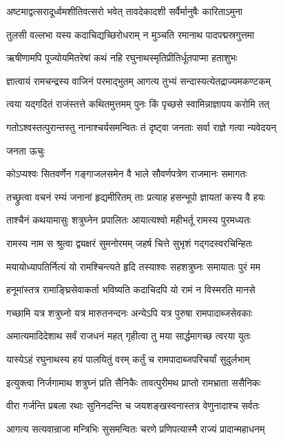 \twolineshloka
{अष्टमाद्वत्सरादूर्ध्वमशीतिवत्सरो भवेत्}
{तावदेकादशी सर्वैर्मानुषैः कारिताऽमुना}%

\twolineshloka
{तुलसी वल्लभा यस्य कदाचिद्यच्छिरोधराम्}
{न मुञ्चति रमानाथ पादपद्मस्रगुत्तमा}%

\twolineshloka
{ऋषीणामपि पूज्योयमितरेषां कथं नहि}
{रघुनाथस्मृतिप्रीतिर्धूतपाप्मा हताशुभः}%

\twolineshloka
{ज्ञात्वायं रामचन्द्रस्य वाजिनं परमाद्भुतम्}
{आगत्य तुभ्यं सन्दास्यत्येतद्राज्यमकण्टकम्}%

\twolineshloka
{त्वया यद्गदितं राजंस्तत्ते कथितमुत्तमम्}
{पुनः किं पृच्छसे स्वामिन्नाज्ञापय करोमि तत्}%


\twolineshloka
{गतोऽश्वस्तत्पुरान्तस्तु नानाश्चर्यसमन्वितः}
{तं दृष्ट्वा जनताः सर्वा राज्ञे गत्वा न्यवेदयन्}%

जनता ऊचुः

\twolineshloka
{कोऽप्यश्वः सितवर्णेन गङ्गाजलसमेन वै}
{भाले सौवर्णपत्रेण राजमानः समागतः}%

\twolineshloka
{तच्छ्रुत्वा वचनं रम्यं जनानां हृद्यमीरितम्}
{ताः प्रत्याह हसन्भूपो ज्ञायतां कस्य वै हयः}%

\twolineshloka
{ताश्चैनं कथयामासुः शत्रुघ्नेन प्रपालितः}
{आयात्यश्वो महीभर्तू रामस्य पुरमध्यतः}%

\twolineshloka
{रामस्य नाम स श्रुत्वा द्व्यक्षरं सुमनोरमम्}
{जहर्ष चित्ते सुभृशं गद्गदस्वरचिन्हितः}%

\twolineshloka
{मयायोध्यापतिर्नित्यं यो रामश्चिन्त्यते हृदि}
{तस्याश्वः सहशत्रुघ्नः समायातः पुरं मम}%

\twolineshloka
{हनूमांस्तत्र रामाङ्घ्रिसेवाकर्ता भविष्यति}
{कदाचिदपि यो रामं न विस्मरति मानसे}%

\twolineshloka
{गच्छामि यत्र शत्रुघ्नो यत्र मारुतनन्दनः}
{अन्येऽपि यत्र पुरुषा रामपादाब्जसेवकाः}%

\twolineshloka
{अमात्यमादिदेशाथ सर्वं राजधनं महत्}
{गृहीत्वा तु मया सार्द्धमागच्छ त्वरया युतः}%

\twolineshloka
{यास्येऽहं रघुनाथस्य हयं पालयितुं वरम्}
{कर्तुं च रामपादाब्जपरिचर्यां सुदुर्लभाम्}%

\twolineshloka
{इत्युक्त्वा निर्जगामाथ शत्रुघ्नं प्रति सैनिकैः}
{तावत्पुरीमथ प्राप्तो रामभ्राता ससैनिकः}%

\twolineshloka
{वीरा गर्जन्ति प्रबला रथाः सुनिनदन्ति च}
{जयशङ्खस्वनास्तत्र वेणुनादाश्च सर्वतः}%

\twolineshloka
{आगत्य सत्यवान्राजा मन्त्रिभिः सुसमन्वितः}
{चरणे प्रणिपत्यास्मै राज्यं प्रादान्महाधनम्}%

